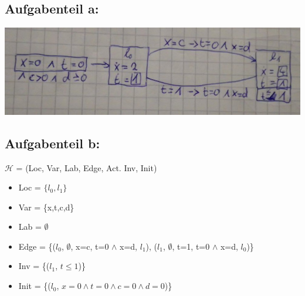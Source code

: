 
\subsection*{Aufgabenteil a:}
\includegraphics[width=\textwidth]{1.jpeg}

\subsection*{Aufgabenteil b:}

$\mathcal{H}$ = (Loc, Var, Lab, Edge, Act. Inv, Init)\\
\begin{itemize}
\item Loc = $\{l_0, l_1\}$
\item Var = \{x,t,c,d\}
\item Lab = $\emptyset$
\item Edge = \{($l_0$, $\emptyset$, x=c, t=0 $\wedge$ x=d, $l_1$), ($l_1$, $\emptyset$, t=1, t=0 $\wedge$ x=d, $l_0$)\}
\item Inv = \{($l_1$, $t\leq 1$)\}
\item Init = \{($l_0$, $x=0\wedge t=0\wedge c=0\wedge d=0$)\}
\end{itemize}